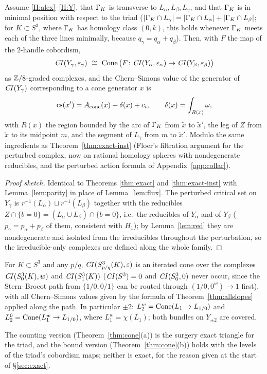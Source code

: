 \begin{theorem}\label{thm:allslopes}
Assume \ref{H:alex}--\ref{H:Y}, that $\Gamma_K$ is transverse to $L_\alpha,L_\beta,L_\gamma$, and that $\Gamma_K$ is in minimal
position with respect to the triad ($|\Gamma_K\cap L_\gamma|=|\Gamma_K\cap L_\alpha|+|\Gamma_K\cap L_\beta|$; for $K\subset S^3$,
where $\Gamma_K$ has homology class $(0,k)$, this holds whenever $\Gamma_K$ meets each of the three lines minimally,
because $q_\gamma=q_\alpha+q_\beta$).  Then, with $F$ the map of the $2$-handle cobordism,
\[
\CI(Y_\gamma,\varepsilon_\gamma)\ \cong\ \Cone\big(F\colon\CI(Y_\alpha,\varepsilon_\alpha)\to\CI(Y_\beta,\varepsilon_\beta)\big)
\]
as $\mathbb{Z}/8$-graded complexes, and the Chern--Simons value of the generator of $\mathit{CI}(Y_\gamma)$ corresponding to a
cone generator $x$ is
\[
\mathrm{cs}(x')=A_{\rm cone}(x)+\delta(x)+c_i,\qquad \delta(x)=\int_{R(x)}\omega,
\]
with $R(x)$ the region bounded by the arc of $\tilde{\Gamma_K}$ from $\tilde x$ to $\tilde x'$, the leg of $Z$ from $\tilde x$ to
its midpoint $m$, and the segment of $L_\gamma$ from $m$ to $\tilde x'$.  Modulo the same ingredients as
Theorem~\ref{thm:exact-inst} (Floer's filtration argument for the perturbed complex, now on rational homology
spheres with nondegenerate reducibles, and the perturbed action formula of Appendix~\ref{app:collar}).
\end{theorem}
\begin{proof}[Proof sketch]
Identical to Theorems \ref{thm:exact} and \ref{thm:exact-inst} with Lemma~\ref{lem:parity} in place of
Lemma~\ref{lem:flux}.  The perturbed critical set on $Y_\gamma$ is $r^{-1}(L_\alpha)\sqcup r^{-1}(L_\beta)$ together with the
reducibles $Z\cap\{b=0\}=(L_\alpha\cup L_\beta)\cap\{b=0\}$, i.e.\ the reducibles of $Y_\alpha$ and of $Y_\beta$ ($p_\gamma=p_\alpha+p_\beta$
of them, consistent with $H_1$); by Lemma~\ref{lem:red} they are nondegenerate and isolated from the
irreducibles throughout the perturbation, so the irreducible-only complexes are defined along the whole family.
\end{proof}

\begin{corollary}\label{cor:SB}
For $K\subset S^3$ and any $p/q$, $\mathit{CI}(S^3_{p/q}(K),\varepsilon)$ is an iterated cone over the complexes
$\mathit{CI}(S^3_0(K),w)$ and $\mathit{CI}(S^3_1(K))$ ($\mathit{CI}(S^3)=0$ and $\mathit{CI}(S^3_0,0)$ never occur, since the Stern--Brocot path
from $\{1/0,0/1\}$ can be routed through $(1/0,0^w)\to1$ first), with all Chern--Simons values given by the
formula of Theorem~\ref{thm:allslopes} applied along the path.  In particular $\pm2$: $L^w_2=\operatorname{Cone}(L_1\to L_{1/0})$ and
$L^0_2=\operatorname{Cone}(L^w_1\to L_{1/0})$, where $L^w_1=\chi(L_1)$; both bundles on $Y_{\pm2}$ are covered.
\end{corollary}
The counting version (Theorem~\ref{thm:cone}(a)) is the surgery exact triangle for the triad, and the bound
version (Theorem~\ref{thm:cone}(b)) holds with the levels of the triad's cobordism maps; neither is exact, for the
reason given at the start of \S\ref{sec:exact}.
